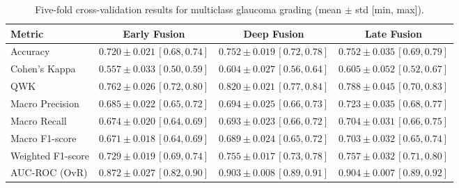 \documentclass[preprint,12pt]{elsarticle}
\begin{document}
\begin{table}[!t]
    \centering
    \caption{Five-fold cross-validation results for multiclass glaucoma grading (mean $\pm$ std [min, max]).}
    \label{tab:grading_cv_summary}
    \scriptsize
    \setlength{\tabcolsep}{6pt}
    \begin{tabular}{|l|c|c|c|}
        \hline
        \textbf{Metric}                & \textbf{Early Fusion} & \textbf{Deep Fusion} & \textbf{Late Fusion} \\
        \hline
        Accuracy                       &
        $0.720 \pm 0.021\,[0.68,0.74]$ &
        $0.752 \pm 0.019\,[0.72,0.78]$ &
        $0.752 \pm 0.035\,[0.69,0.79]$                                                                       \\

        Cohen's Kappa                  &
        $0.557 \pm 0.033\,[0.50,0.59]$ &
        $0.604 \pm 0.027\,[0.56,0.64]$ &
        $0.605 \pm 0.052\,[0.52,0.67]$                                                                       \\

        QWK                            &
        $0.762 \pm 0.026\,[0.72,0.80]$ &
        $0.820 \pm 0.021\,[0.77,0.84]$ &
        $0.788 \pm 0.045\,[0.70,0.83]$                                                                       \\

        Macro Precision                &
        $0.685 \pm 0.022\,[0.65,0.72]$ &
        $0.694 \pm 0.025\,[0.66,0.73]$ &
        $0.723 \pm 0.035\,[0.68,0.77]$                                                                       \\

        Macro Recall                   &
        $0.674 \pm 0.020\,[0.64,0.69]$ &
        $0.693 \pm 0.023\,[0.66,0.72]$ &
        $0.704 \pm 0.031\,[0.66,0.75]$                                                                       \\

        Macro F1-score                 &
        $0.671 \pm 0.018\,[0.64,0.69]$ &
        $0.689 \pm 0.024\,[0.65,0.72]$ &
        $0.703 \pm 0.032\,[0.65,0.74]$                                                                       \\

        Weighted F1-score              &
        $0.729 \pm 0.019\,[0.69,0.74]$ &
        $0.755 \pm 0.017\,[0.73,0.78]$ &
        $0.757 \pm 0.032\,[0.71,0.80]$                                                                       \\

        AUC-ROC (OvR)                  &
        $0.872 \pm 0.027\,[0.82,0.90]$ &
        $0.903 \pm 0.008\,[0.89,0.91]$ &
        $0.904 \pm 0.007\,[0.89,0.92]$                                                                       \\
        \hline
    \end{tabular}
\end{table}
\end{document}
